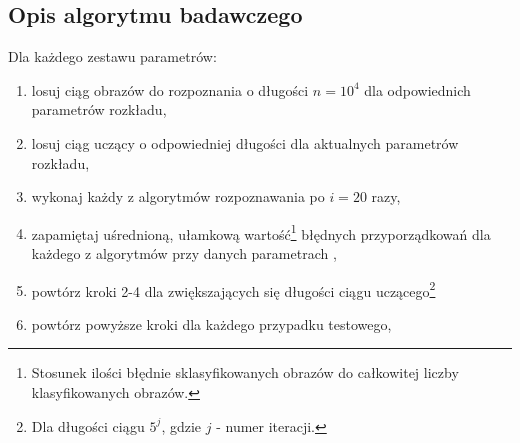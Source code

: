 	\subsection{Opis algorytmu badawczego}
	
	Dla każdego zestawu parametrów:
	\begin{enumerate}
	\item losuj ciąg obrazów do rozpoznania o długości $n = 10^4$ dla odpowiednich parametrów rozkładu,
	\item losuj ciąg uczący o odpowiedniej długości dla aktualnych parametrów rozkładu,
	\item wykonaj każdy z algorytmów rozpoznawania po $i = 20$  razy,
	\item zapamiętaj uśrednioną, ułamkową wartość\footnote{Stosunek ilości błędnie sklasyfikowanych obrazów do całkowitej liczby klasyfikowanych obrazów.} błędnych przyporządkowań dla każdego z algorytmów przy danych parametrach ,
	\item powtórz kroki 2-4 dla zwiększających się długości ciągu uczącego\footnote{Dla długości ciągu $5^j$, gdzie $j$ - numer iteracji.}
	\item powtórz powyższe kroki dla każdego przypadku testowego,
	\end{enumerate}